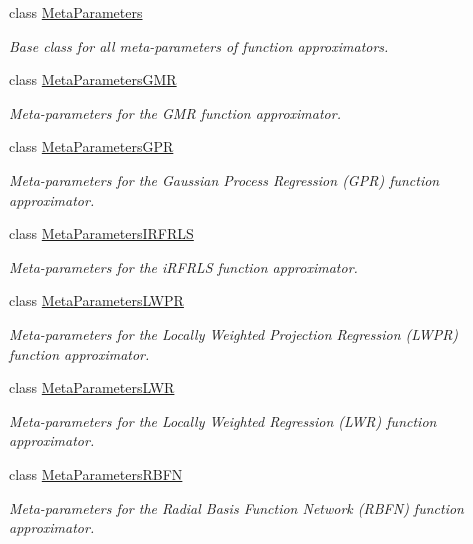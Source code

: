 \begin{DoxyCompactItemize}
class \hyperlink{classDmpBbo_1_1MetaParameters}{Meta\+Parameters}
\begin{DoxyCompactList}\small\item\em Base class for all meta-\/parameters of function approximators. \end{DoxyCompactList}\item 
class \hyperlink{classDmpBbo_1_1MetaParametersGMR}{Meta\+Parameters\+G\+M\+R}
\begin{DoxyCompactList}\small\item\em Meta-\/parameters for the G\+M\+R function approximator. \end{DoxyCompactList}\item 
class \hyperlink{classDmpBbo_1_1MetaParametersGPR}{Meta\+Parameters\+G\+P\+R}
\begin{DoxyCompactList}\small\item\em Meta-\/parameters for the Gaussian Process Regression (G\+P\+R) function approximator. \end{DoxyCompactList}\item 
class \hyperlink{classDmpBbo_1_1MetaParametersIRFRLS}{Meta\+Parameters\+I\+R\+F\+R\+L\+S}
\begin{DoxyCompactList}\small\item\em Meta-\/parameters for the i\+R\+F\+R\+L\+S function approximator. \end{DoxyCompactList}\item 
class \hyperlink{classDmpBbo_1_1MetaParametersLWPR}{Meta\+Parameters\+L\+W\+P\+R}
\begin{DoxyCompactList}\small\item\em Meta-\/parameters for the Locally Weighted Projection Regression (L\+W\+P\+R) function approximator. \end{DoxyCompactList}\item 
class \hyperlink{classDmpBbo_1_1MetaParametersLWR}{Meta\+Parameters\+L\+W\+R}
\begin{DoxyCompactList}\small\item\em Meta-\/parameters for the Locally Weighted Regression (L\+W\+R) function approximator. \end{DoxyCompactList}\item 
class \hyperlink{classDmpBbo_1_1MetaParametersRBFN}{Meta\+Parameters\+R\+B\+F\+N}
\begin{DoxyCompactList}\small\item\em Meta-\/parameters for the Radial Basis Function Network (R\+B\+F\+N) function approximator. \end{DoxyCompactList}\item 

\end{DoxyCompactItemize}
